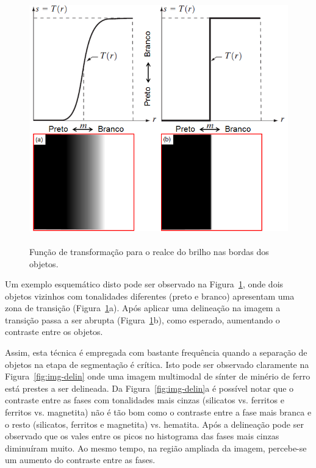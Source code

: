 \begin{figure} [h]
  \begin{center}
    \includegraphics[height=307pt,width=350pt]{images/fig_transf-delin}
    \caption{Função de transformação para o realce do brilho nas
      bordas dos objetos.\cite{88}}\label{fig:transf-delin}
  \end{center}
\end{figure}

Um exemplo esquemático disto pode ser observado na
Figura~\ref{fig:transf-delin}, onde dois objetos vizinhos com
tonalidades diferentes (preto e branco) apresentam uma zona de
transição (Figura~\ref{fig:transf-delin}a). Após aplicar uma
delineação na imagem a transição passa a ser abrupta
(Figura~\ref{fig:transf-delin}b), como esperado, aumentando o
contraste entre os objetos.

Assim, esta técnica é empregada com bastante frequência quando a
separação de objetos na etapa de segmentação é crítica. Isto pode ser
observado claramente na Figura~\ref{fig:img-delin} onde uma imagem
multimodal de sínter de minério de ferro está prestes a ser
delineada. Da Figura~\ref{fig:img-delin}a é possível notar que o
contraste entre as fases com tonalidades mais cinzas (silicatos
vs. ferritos e ferritos vs. magnetita) não é tão bom como o contraste
entre a fase mais branca e o resto (silicatos, ferritos e magnetita)
vs. hematita. Após a delineação pode ser observado que os vales entre
os picos no histograma das fases mais cinzas diminuíram muito. Ao
mesmo tempo, na região ampliada da imagem, percebe-se um aumento do
contraste entre as fases.

